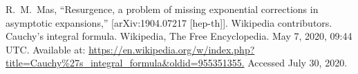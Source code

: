 \documentclass{exam}
\begin{document}
\begin{thebibliography}{666}
    R.~M.~Mas,
    ``Resurgence, a problem of missing exponential corrections in asymptotic expansions,''
    [arXiv:1904.07217 [hep-th]].
    Wikipedia contributors. Cauchy's integral formula. Wikipedia, The Free
    Encyclopedia. May 7, 2020, 09:44 UTC. Available at:
    \url{https://en.wikipedia.org/w/index.php?title=Cauchy\%27s_integral_formula&oldid=955351355.}
    Accessed July 30, 2020.
\end{thebibliography}
\end{document}
